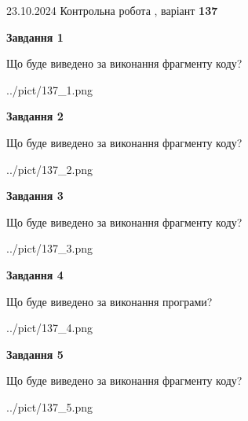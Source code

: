 \documentclass[12pt, ukrainian]{article}
\begin{document}
{\Large{23.10.2024 Контрольна робота , варіант  \No \textbf { 137 }\par}}
{
\begin {large}
{\begin {center}\textbf{Завдання 1}\end {center}}

Що буде виведено за виконання фрагменту коду?\par
\begin{center}
	{../pict/137_1.png}
\end{center}
\newpage

{\begin {center}\textbf{Завдання 2}\end {center}}

Що буде виведено за виконання фрагменту коду?\par
\begin{center}
	{../pict/137_2.png}
\end{center}
\newpage

{\begin {center}\textbf{Завдання 3}\end {center}}

Що буде виведено за виконання фрагменту коду?\par
\begin{center}
	{../pict/137_3.png}
\end{center}
\newpage

{\begin {center}\textbf{Завдання 4}\end {center}}

Що буде виведено за виконання програми?\par
\begin{center}
	{../pict/137_4.png}
\end{center}
\newpage

{\begin {center}\textbf{Завдання 5}\end {center}}

Що буде виведено за виконання фрагменту коду?\par
\begin{center}
	{../pict/137_5.png}
\end{center}
\newpage


\end{large}}
\end{document}
